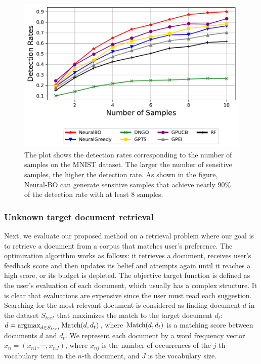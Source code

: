 \begin{figure}[H]
    \centering
    \includegraphics[width=\textwidth]{Figures/Neural-BO/Neural-BO_sensitive_sample_detection_rate.pdf}
    \caption{The plot shows the detection rates corresponding to the number of samples on the MNIST dataset. The larger the number of sensitive samples, the higher the detection rate. As shown in the figure, Neural-BO can generate sensitive samples that achieve nearly 90\% of the detection rate with at least 8 samples.}
    \label{fig:neural-bo_sensitive_sample}
\end{figure}
\subsubsection{Unknown target document retrieval}

Next, we evaluate our proposed method on a retrieval problem where our goal is to retrieve a document from a corpus that matches user's preference. The optimization algorithm works as follows: it retrieves a document, receives user's feedback score and then updates its belief and attempts again until it reaches a high score, or its budget is depleted. The objective target function is defined as the user's evaluation of each document, which usually has a complex structure. It is clear that evaluations are expensive since the user must read each suggestion. Searching for the most relevant document is considered as finding document $d$ in the dataset $S_{text}$ that maximizes the match to the target document $d_t$: $d = \operatorname*{argmax}_{d \in S_{text}} \textup{Match}(d, d_t)$, where $\textup{Match}(d, d_t)$ is a matching score between documents $d$ and $d_t$. We represent each document by a word frequency vector $x_{n} = (x_{n1}, \cdots, x_{nJ})$, where $x_{nj}$ is the number of occurrences of the $j$-th vocabulary term in the $n$-th document, and $J$ is the vocabulary size.  

